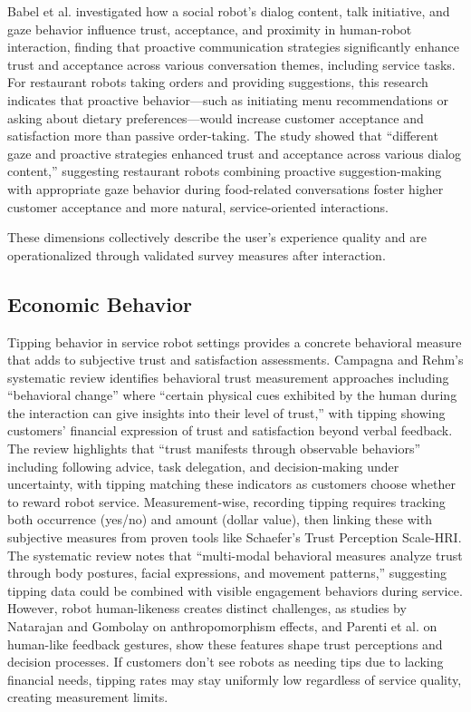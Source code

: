 \documentclass[conference]{IEEEtran}
\begin{document}
Babel et al. \cite{b21} investigated how a social robot's dialog content, talk initiative, and gaze behavior influence trust, acceptance, and proximity in human-robot interaction, finding that proactive communication strategies significantly enhance trust and acceptance across various conversation themes, including service tasks. For restaurant robots taking orders and providing suggestions, this research indicates that proactive behavior—such as initiating menu recommendations or asking about dietary preferences—would increase customer acceptance and satisfaction more than passive order-taking. The study showed that ``different gaze and proactive strategies enhanced trust and acceptance across various dialog content,'' suggesting restaurant robots combining proactive suggestion-making with appropriate gaze behavior during food-related conversations foster higher customer acceptance and more natural, service-oriented interactions.

These dimensions collectively describe the user's experience quality and are operationalized through validated survey measures after interaction.

\subsection{Economic Behavior}
Tipping behavior in service robot settings provides a concrete behavioral measure that adds to subjective trust and satisfaction assessments. Campagna and Rehm's systematic review identifies behavioral trust measurement approaches including ``behavioral change'' where ``certain physical cues exhibited by the human during the interaction can give insights into their level of trust,'' with tipping showing customers' financial expression of trust and satisfaction beyond verbal feedback. The review highlights that ``trust manifests through observable behaviors'' including following advice, task delegation, and decision-making under uncertainty, with tipping matching these indicators as customers choose whether to reward robot service. Measurement-wise, recording tipping requires tracking both occurrence (yes/no) and amount (dollar value), then linking these with subjective measures from proven tools like Schaefer's Trust Perception Scale-HRI. The systematic review notes that ``multi-modal behavioral measures analyze trust through body postures, facial expressions, and movement patterns,'' suggesting tipping data could be combined with visible engagement behaviors during service. However, robot human-likeness creates distinct challenges, as studies by Natarajan and Gombolay \cite{b22} on anthropomorphism effects, and Parenti et al. \cite{b23} on human-like feedback gestures, show these features shape trust perceptions and decision processes. If customers don't see robots as needing tips due to lacking financial needs, tipping rates may stay uniformly low regardless of service quality, creating measurement limits.
\end{document}
